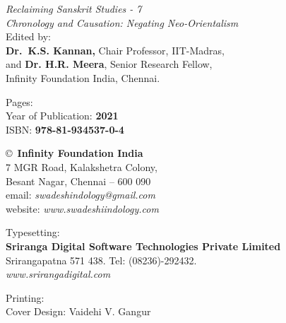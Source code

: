 \thispagestyle{empty}

\noindent
{\fontsize{9}{11}\selectfont\sl Reclaiming Sanskrit Studies - 7}\\
\textit{Chronology and Causation: Negating Neo-Orientalism}\\
Edited by:\\
 {\bf Dr.\ K.S. Kannan,} Chair Professor, IIT-Madras,\\
and {\bf Dr. H.R. Meera}, Senior Research Fellow,\\
 Infinity Foundation India, Chennai.\\
\vfill

\noindent
Pages: {\bf\pageref{bookend}}\\
Year of Publication: {\bf 2021}\\
ISBN: {\bf 978-81-934537-0-4}\\
\vfill

\noindent
\copyright\ {\bf Infinity Foundation India}\\ 
7 MGR Road, Kalakshetra Colony,\\ 
Besant Nagar, Chennai -- 600 090\\
email: {\sl swadeshindology@gmail.com}\\
website: {\sl www.swadeshiindology.com} 
\vfill

\noindent
Typesetting:\\ 
{\bf Sriranga Digital Software Technologies Private Limited}\\ 
Srirangapatna 571 438. Tel: (08236)-292432.\\
{\sl www.srirangadigital.com}
\vfill

\noindent
Printing:\\

\noindent
Cover Design: Vaidehi V. Gangur\\ 
